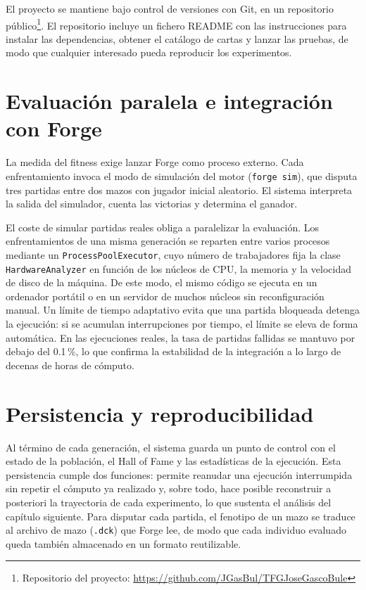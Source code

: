 El proyecto se mantiene bajo control de versiones con Git, en un repositorio público\footnote{Repositorio del proyecto: \url{https://github.com/JGasBul/TFGJoseGascoBule}}. El repositorio incluye un fichero README con las instrucciones para instalar las dependencias, obtener el catálogo de cartas y lanzar las pruebas, de modo que cualquier interesado pueda reproducir los experimentos.

\section{Evaluación paralela e integración con Forge}

La medida del fitness exige lanzar Forge como proceso externo. Cada enfrentamiento invoca el modo de simulación del motor (\texttt{forge sim}), que disputa tres partidas entre dos mazos con jugador inicial aleatorio. El sistema interpreta la salida del simulador, cuenta las victorias y determina el ganador.

El coste de simular partidas reales obliga a paralelizar la evaluación. Los enfrentamientos de una misma generación se reparten entre varios procesos mediante un \texttt{ProcessPoolExecutor}, cuyo número de trabajadores fija la clase \texttt{HardwareAnalyzer} en función de los núcleos de CPU, la memoria y la velocidad de disco de la máquina. De este modo, el mismo código se ejecuta en un ordenador portátil o en un servidor de muchos núcleos sin reconfiguración manual. Un límite de tiempo adaptativo evita que una partida bloqueada detenga la ejecución: si se acumulan interrupciones por tiempo, el límite se eleva de forma automática. En las ejecuciones reales, la tasa de partidas fallidas se mantuvo por debajo del 0.1\,\%, lo que confirma la estabilidad de la integración a lo largo de decenas de horas de cómputo.

\section{Persistencia y reproducibilidad}

Al término de cada generación, el sistema guarda un punto de control con el estado de la población, el Hall of Fame y las estadísticas de la ejecución. Esta persistencia cumple dos funciones: permite reanudar una ejecución interrumpida sin repetir el cómputo ya realizado y, sobre todo, hace posible reconstruir a posteriori la trayectoria de cada experimento, lo que sustenta el análisis del capítulo siguiente. Para disputar cada partida, el fenotipo de un mazo se traduce al archivo de mazo (\texttt{.dck}) que Forge lee, de modo que cada individuo evaluado queda también almacenado en un formato reutilizable.
